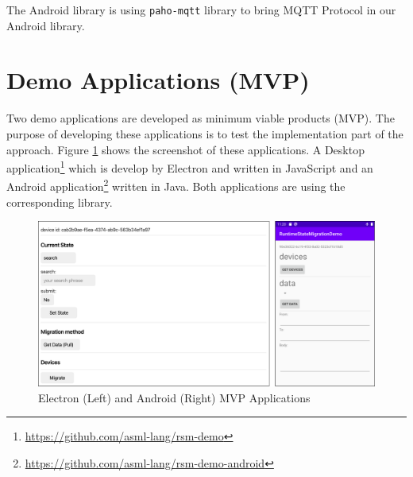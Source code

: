 The Android library is using \lstinline[basicstyle=\ttfamily]{paho-mqtt} library to bring MQTT Protocol in our Android library.

\section{Demo Applications (MVP)}
Two demo applications are developed as minimum viable products (MVP). The purpose of developing these applications is to test the implementation part of the approach. Figure \ref{fig:mvp} shows the screenshot of these applications. A Desktop application\footnote{\url{https://github.com/asml-lang/rsm-demo}} which is develop by Electron and written in JavaScript and an Android application\footnote{\url{https://github.com/asml-lang/rsm-demo-android}} written in Java. Both applications are using the corresponding library.

\FloatBarrier
\begin{figure}[H]
    \includegraphics[width=\linewidth]{../figures/mvp.png}
    \centering
    \caption{Electron (Left) and Android (Right) MVP Applications}
    \label{fig:mvp}
\end{figure}
\FloatBarrier

% 

